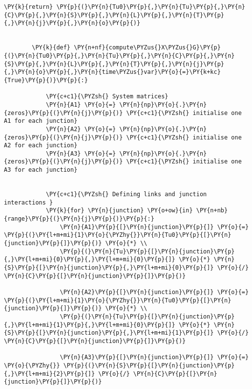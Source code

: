 \begin{Verbatim}[commandchars=\\\{\}]
            \PY{k}{return} \PY{p}{(}\PY{n}{Tu0}\PY{p}{,}\PY{n}{Tu}\PY{p}{,}\PY{n}{C}\PY{p}{,}\PY{n}{S}\PY{p}{,}\PY{n}{L}\PY{p}{,}\PY{n}{T}\PY{p}{,}\PY{n}{j}\PY{p}{,}\PY{n}{o}\PY{p}{)}
        
        
        \PY{k}{def} \PY{n+nf}{compute\PYZus{}X\PYZus{}G}\PY{p}{(}\PY{n}{Tu0}\PY{p}{,}\PY{n}{Tu}\PY{p}{,}\PY{n}{C}\PY{p}{,}\PY{n}{S}\PY{p}{,}\PY{n}{L}\PY{p}{,}\PY{n}{T}\PY{p}{,}\PY{n}{j}\PY{p}{,}\PY{n}{o}\PY{p}{,}\PY{n}{time\PYZus{}var}\PY{o}{=}\PY{k+kc}{True}\PY{p}{)}\PY{p}{:}
        
            \PY{c+c1}{\PYZsh{} System matrices}
            \PY{n}{A1} \PY{o}{=} \PY{n}{np}\PY{o}{.}\PY{n}{zeros}\PY{p}{(}\PY{n}{j}\PY{p}{)} \PY{c+c1}{\PYZsh{} initialise one A1 for each junction}
            \PY{n}{A2} \PY{o}{=} \PY{n}{np}\PY{o}{.}\PY{n}{zeros}\PY{p}{(}\PY{n}{j}\PY{p}{)} \PY{c+c1}{\PYZsh{} initialise one A2 for each junction}
            \PY{n}{A3} \PY{o}{=} \PY{n}{np}\PY{o}{.}\PY{n}{zeros}\PY{p}{(}\PY{n}{j}\PY{p}{)} \PY{c+c1}{\PYZsh{} initialise one A3 for each junction}
            
            
            \PY{c+c1}{\PYZsh{} Defining links and junction interactions }
            \PY{k}{for} \PY{n}{junction} \PY{o+ow}{in} \PY{n+nb}{range}\PY{p}{(}\PY{n}{j}\PY{p}{)}\PY{p}{:}
                \PY{n}{A1}\PY{p}{[}\PY{n}{junction}\PY{p}{]} \PY{o}{=} \PY{p}{(}\PY{l+m+mi}{1}\PY{o}{\PYZhy{}}\PY{n}{Tu0}\PY{p}{[}\PY{n}{junction}\PY{p}{]}\PY{p}{)} \PY{o}{*} \\
                \PY{p}{(}\PY{n}{Tu}\PY{p}{[}\PY{n}{junction}\PY{p}{,}\PY{l+m+mi}{0}\PY{p}{,}\PY{l+m+mi}{0}\PY{p}{]} \PY{o}{*} \PY{n}{S}\PY{p}{[}\PY{n}{junction}\PY{p}{,}\PY{l+m+mi}{0}\PY{p}{]} \PY{o}{/} \PY{n}{C}\PY{p}{[}\PY{n}{junction}\PY{p}{]}\PY{p}{)}
                
                \PY{n}{A2}\PY{p}{[}\PY{n}{junction}\PY{p}{]} \PY{o}{=} \PY{p}{(}\PY{l+m+mi}{1}\PY{o}{\PYZhy{}}\PY{n}{Tu0}\PY{p}{[}\PY{n}{junction}\PY{p}{]}\PY{p}{)} \PY{o}{*} \\
                \PY{p}{(}\PY{n}{Tu}\PY{p}{[}\PY{n}{junction}\PY{p}{,}\PY{l+m+mi}{1}\PY{p}{,}\PY{l+m+mi}{0}\PY{p}{]} \PY{o}{*} \PY{n}{S}\PY{p}{[}\PY{n}{junction}\PY{p}{,}\PY{l+m+mi}{1}\PY{p}{]} \PY{o}{/} \PY{n}{C}\PY{p}{[}\PY{n}{junction}\PY{p}{]}\PY{p}{)}
                
                \PY{n}{A3}\PY{p}{[}\PY{n}{junction}\PY{p}{]} \PY{o}{=} \PY{o}{\PYZhy{}} \PY{p}{(}\PY{n}{S}\PY{p}{[}\PY{n}{junction}\PY{p}{,}\PY{l+m+mi}{2}\PY{p}{]} \PY{o}{/} \PY{n}{C}\PY{p}{[}\PY{n}{junction}\PY{p}{]}\PY{p}{)}
        

\end{Verbatim}

